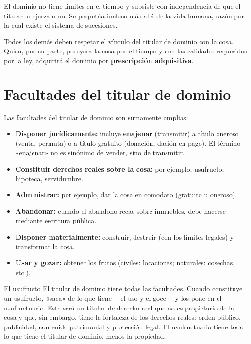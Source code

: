 \documentclass[12pt,oneside]{book}
\begin{document}
El dominio no tiene límites en el tiempo y subsiste con independencia de que el titular lo ejerza o no. Se perpetúa incluso más allá de la vida humana, razón por la cual existe el sistema de sucesiones.

Todos los demás deben respetar el vínculo del titular de dominio con la cosa. Quien, por su parte, poseyera la cosa por el tiempo y con las calidades requeridas por la ley, adquirirá el dominio por \textbf{prescripción adquisitiva}.

\section{Facultades del titular de dominio}

Las facultades del titular de dominio son sumamente amplias:

\begin{itemize}
    \item \textbf{Disponer jurídicamente:} incluye \textbf{enajenar} (transmitir) a título oneroso (venta, permuta) o a título gratuito (donación, dación en pago). El término «enajenar» no es sinónimo de vender, sino de transmitir.
    \item \textbf{Constituir derechos reales sobre la cosa:} por ejemplo, usufructo, hipoteca, servidumbre.
    \item \textbf{Administrar:} por ejemplo, dar la cosa en comodato (gratuito u oneroso).
    \item \textbf{Abandonar:} cuando el abandono recae sobre inmuebles, debe hacerse mediante escritura pública.
    \item \textbf{Disponer materialmente:} construir, destruir (con los límites legales) y transformar la cosa.
    \item \textbf{Usar y gozar:} obtener los frutos (civiles: locaciones; naturales: cosechas, etc.).
\end{itemize}

\begin{example}{El usufructo}
El titular de dominio tiene todas las facultades. Cuando constituye un usufructo, «saca» de lo que tiene ---el uso y el goce--- y los pone en el usufructuario. Este será un titular de derecho real que no es propietario de la cosa y que, sin embargo, tiene la fortaleza de los derechos reales: orden público, publicidad, contenido patrimonial y protección legal. El usufructuario tiene todo lo que tiene el titular de dominio, menos la propiedad.
\end{example}
\end{document}
